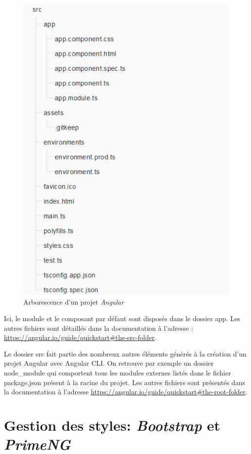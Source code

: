 \documentclass{polytech/polytech}
\begin{document}
\begin{figure}
	\includegraphics[scale=0.85]{images/arborescenceSrc}
	\caption{Arborescence d'un projet \textit{Angular}}
	\label{fig:arborescenceAngular}
\end{figure}

Ici, le module et le composant par défaut sont disposés dans le dossier app. Les autres fichiers sont détaillés dans la documentation à l’adresse : \url{https://angular.io/guide/quickstart#the-src-folder}.

Le dossier src fait partie des nombreux autres éléments générés à la création d’un projet Angular avec Angular CLI. On retrouve par exemple un dossier node\_module qui comportent tous les modules externes listés dans le fichier package.json présent à la racine du projet. Les autres fichiers sont présentés dans la documentation à l’adresse \url{https://angular.io/guide/quickstart#the-root-folder}.


\section{Gestion des styles: \textit{Bootstrap} et \textit{PrimeNG}}
\end{document}
